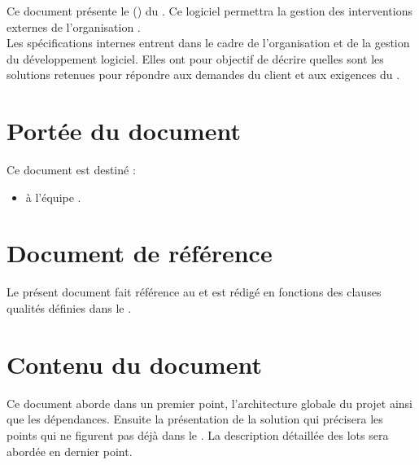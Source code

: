 Ce document présente le \DSI{} (\DSICourt) du \PIC{} \nomPIC. Ce logiciel permettra la gestion des interventions externes de l'organisation \nomClient. \\

	Les spécifications internes entrent dans le cadre de l'organisation et de la gestion du développement logiciel. Elles ont pour objectif de décrire quelles sont les solutions retenues pour répondre aux demandes du client et aux exigences du \DSECourt{}. 
	
\section*{Portée du document}
	Ce document est destiné :
	\begin{itemize}
		\item à l'équipe \PICCourt{} \nomEquipe.
	\end{itemize}
	
\section*{Document de référence}
	Le présent document fait référence au \DSE{} et est rédigé en fonctions des clauses qualités définies dans le \PQ.
	
\section*{Contenu du document}
	Ce document aborde dans un premier point, l'architecture globale du projet ainsi que les dépendances. Ensuite la présentation de la solution qui précisera les points qui ne figurent pas déjà dans le \DSECourt{}. La description détaillée des lots sera abordée en dernier point.